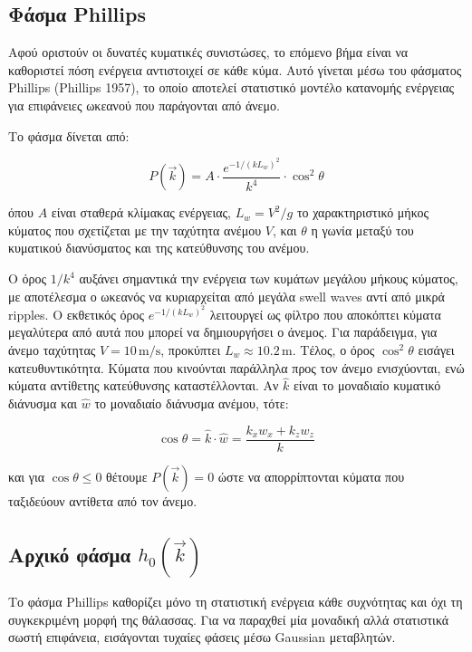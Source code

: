 \documentclass[a4paper, 11pt]{article}
\begin{document}
\subsection{Φάσμα Phillips}\label{ux3c6ux3acux3c3ux3bcux3b1-phillips}

Αφού οριστούν οι δυνατές κυματικές συνιστώσες, το επόμενο βήμα είναι να
καθοριστεί πόση ενέργεια αντιστοιχεί σε κάθε κύμα. Αυτό γίνεται μέσω του
φάσματος Phillips (Phillips 1957), το οποίο αποτελεί στατιστικό μοντέλο
κατανομής ενέργειας για επιφάνειες ωκεανού που παράγονται από άνεμο.

Το φάσμα δίνεται από:

\[
P(\vec{k}) =
A
\cdot
\frac{e^{-1/(kL_w)^2}}{k^4}
\cdot
\cos^2\theta
\]

όπου \(A\) είναι σταθερά κλίμακας ενέργειας, \(L_w = V^2/g\) το
χαρακτηριστικό μήκος κύματος που σχετίζεται με την ταχύτητα ανέμου
\(V\), και \(\theta\) η γωνία μεταξύ του κυματικού διανύσματος και της
κατεύθυνσης του ανέμου.

Ο όρος \(1/k^4\) αυξάνει σημαντικά την ενέργεια των κυμάτων μεγάλου
μήκους κύματος, με αποτέλεσμα ο ωκεανός να κυριαρχείται από μεγάλα swell
waves αντί από μικρά ripples. Ο εκθετικός όρος \(e^{-1/(kL_w)^2}\)
λειτουργεί ως φίλτρο που αποκόπτει κύματα μεγαλύτερα από αυτά που μπορεί
να δημιουργήσει ο άνεμος. Για παράδειγμα, για άνεμο ταχύτητας
\(V=10\,\text{m/s}\), προκύπτει \(L_w \approx 10.2\,\text{m}\). Τέλος, ο
όρος \(\cos^2\theta\) εισάγει κατευθυντικότητα. Κύματα που κινούνται
παράλληλα προς τον άνεμο ενισχύονται, ενώ κύματα αντίθετης κατεύθυνσης
καταστέλλονται. Αν \(\hat{k}\) είναι το μοναδιαίο κυματικό διάνυσμα και
\(\hat{w}\) το μοναδιαίο διάνυσμα ανέμου, τότε:

\[
\cos\theta
=
\hat{k}\cdot\hat{w}
=
\frac{k_xw_x + k_zw_z}{k}
\]

και για \(\cos\theta \le 0\) θέτουμε \(P(\vec{k}) = 0\) ώστε να
απορρίπτονται κύματα που ταξιδεύουν αντίθετα από τον άνεμο.

\subsection{\texorpdfstring{Αρχικό φάσμα
\(h_0(\vec{k})\)}{Αρχικό φάσμα h\_0(\textbackslash vec\{k\})}}\label{ux3b1ux3c1ux3c7ux3b9ux3baux3cc-ux3c6ux3acux3c3ux3bcux3b1-h_0veck}

Το φάσμα Phillips καθορίζει μόνο τη στατιστική ενέργεια κάθε συχνότητας
και όχι τη συγκεκριμένη μορφή της θάλασσας. Για να παραχθεί μία μοναδική
αλλά στατιστικά σωστή επιφάνεια, εισάγονται τυχαίες φάσεις μέσω Gaussian
μεταβλητών.
\end{document}

